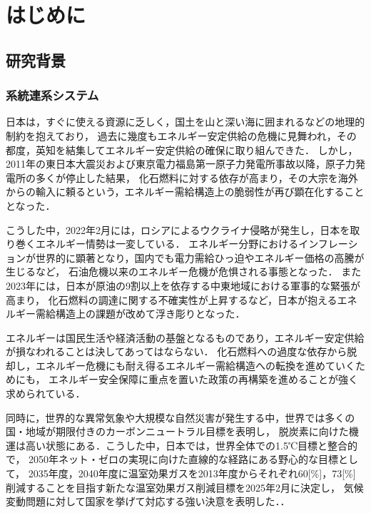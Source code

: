 
\chapter{はじめに}
\label{chap:first}

\section{研究背景}
\subsection{系統連系システム}
日本は，すぐに使える資源に乏しく，国土を山と深い海に囲まれるなどの地理的制約を抱えており，
過去に幾度もエネルギー安定供給の危機に見舞われ，その都度，英知を結集してエネルギー安定供給の確保に取り組んできた．
しかし，2011年の東日本大震災および東京電力福島第一原子力発電所事故以降，原子力発電所の多くが停止した結果，
化石燃料に対する依存が高まり，その大宗を海外からの輸入に頼るという，エネルギー需給構造上の脆弱性が再び顕在化することとなった．

こうした中，2022年2月には，ロシアによるウクライナ侵略が発生し，日本を取り巻くエネルギー情勢は一変している．
エネルギー分野におけるインフレーションが世界的に顕著となり，国内でも電力需給ひっ迫やエネルギー価格の高騰が生じるなど，
石油危機以来のエネルギー危機が危惧される事態となった．
また2023年には，日本が原油の9割以上を依存する中東地域における軍事的な緊張が高まり，
化石燃料の調達に関する不確実性が上昇するなど，日本が抱えるエネルギー需給構造上の課題が改めて浮き彫りとなった．

エネルギーは国民生活や経済活動の基盤となるものであり，エネルギー安定供給が損なわれることは決してあってはならない．
化石燃料への過度な依存から脱却し，エネルギー危機にも耐え得るエネルギー需給構造への転換を進めていくためにも，
エネルギー安全保障に重点を置いた政策の再構築を進めることが強く求められている．

同時に，世界的な異常気象や大規模な自然災害が発生する中，世界では多くの国・地域が期限付きのカーボンニュートラル目標を表明し，
脱炭素に向けた機運は高い状態にある．こうした中，日本では，世界全体での1.5℃目標と整合的で，
2050年ネット・ゼロの実現に向けた直線的な経路にある野心的な目標として，
2035年度，2040年度に温室効果ガスを2013年度からそれぞれ60[\%]，73[\%]削減することを目指す新たな温室効果ガス削減目標を2025年2月に決定し，
気候変動問題に対して国家を挙げて対応する強い決意を表明した．\cite{ref00}．

